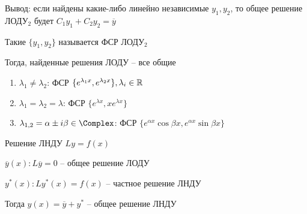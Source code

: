 \documentclass[12pt]{article}
\begin{document}
    \Nota Вывод: если найдены какие-либо линейно независимые $y_1, y_2$, то общее решение ЛОДУ$_2$ будет $C_1 y_1 + C_2 y_2 = \overline{y}$

    \Def Такие $\{y_1, y_2\}$ называется ФСР ЛОДУ$_2$

    \Nota Тогда, найденные решения ЛОДУ -- все общие

    \begin{enumerate}
        \item $\lambda_1 \neq \lambda_2$: ФСР $\{e^{\lambda_1 x}, e^{\lambda_2 x}\}, \lambda_i \in \mathbb{R}$

        \item $\lambda_1 = \lambda_2 = \lambda$: ФСР $\{e^{\lambda x}, x e^{\lambda x}\}$

        \item $\lambda_{1,2} = \alpha \pm i \beta \in \mathbb{\Complex}$: ФСР $\{e^{\alpha x} \cos\beta x, e^{\alpha x} \sin \beta x\}$
    \end{enumerate}

    \begin{MyTheorem}
         Решение ЛНДУ $Ly = f(x)$

        $\overline{y}(x): L\overline{y} = 0$ -- общее решение ЛОДУ

        $y^*(x): Ly^*(x) = f(x)$ -- частное решение ЛНДУ

        Тогда $y(x) = \overline{y} + y^*$ -- общее решение ЛНДУ
    \end{MyTheorem}

    \begin{MyProof} \Lab \end{MyProof}
\end{document}
